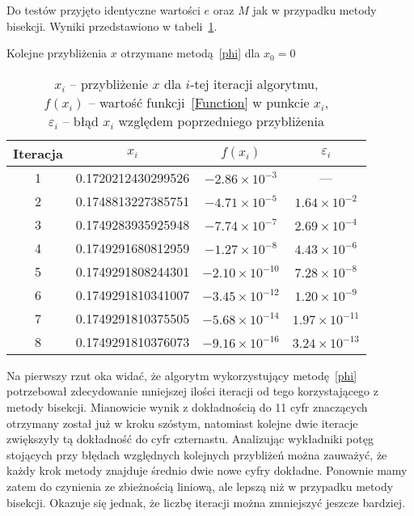 \documentclass[11pt,wide,leqno]{article}
\begin{document}
        Do testów przyjęto identyczne wartości \(e\) oraz \(M\) jak w przypadku metody bisekcji.
        Wyniki przedstawiono w tabeli~\ref{table:two}.
        \begin{table}[h]
            \centering
            \caption{Kolejne przybliżenia \(x\) otrzymane metodą~\eqref{phi}
                    dla \(x_0 = 0\)}\label{table:two}
            \renewcommand{\arraystretch}{1.5}
            \begin{tabular}{|c|c|c|c|} \hline
                Iteracja & \(x_i\) & \(f(x_i)\) & \(\varepsilon_i\) \\ \hline
                1 & 0.1720212430299526 & \(-2.86 \times 10^{-3}\) & --- \\ \hline
                2 & 0.1748813227385751 & \(-4.71 \times 10^{-5}\) & \(1.64 \times 10^{-2}\) \\ \hline
                3 & 0.1749283935925948 & \(-7.74 \times 10^{-7}\) & \(2.69 \times 10^{-4}\) \\ \hline
                4 & 0.1749291680812959 & \(-1.27 \times 10^{-8}\) & \(4.43 \times 10^{-6}\) \\ \hline
                5 & 0.1749291808244301 & \(-2.10 \times 10^{-10}\) & \(7.28 \times 10^{-8}\) \\ \hline
                6 & 0.1749291810341007 & \(-3.45 \times 10^{-12}\) & \(1.20 \times 10^{-9}\) \\ \hline
                7 & 0.1749291810375505 & \(-5.68 \times 10^{-14}\) & \(1.97 \times 10^{-11}\) \\ \hline
                8 & 0.1749291810376073 & \(-9.16 \times 10^{-16}\) & \(3.24 \times 10^{-13}\) \\ \hline
            \end{tabular}
            \caption*{
            \(x_i\) -- przybliżenie \(x\) dla \(i\)-tej iteracji algorytmu, \\
            \(f(x_i)\) -- wartość funkcji~\eqref{Function} w punkcie \(x_i\), \\
            \(\varepsilon_i\) -- błąd \(x_i\) względem poprzedniego przybliżenia}
        \end{table}
        Na pierwszy rzut oka widać, że algorytm wykorzystujący metodę~\eqref{phi} potrzebował zdecydowanie mniejszej
        ilości iteracji od tego korzystającego z metody bisekcji. Mianowicie wynik z dokładnością do 
        11 cyfr znaczących otrzymany został już w kroku szóstym, natomiast kolejne dwie iteracje
        zwiększyły tą dokładność do cyfr czternastu. Analizując wykładniki potęg stojących przy błędach względnych
        kolejnych przybliżeń można zauważyć, że każdy krok metody znajduje średnio dwie nowe cyfry dokładne.
        Ponownie mamy zatem do czynienia ze zbieżnością liniową, ale lepszą niż w przypadku metody bisekcji. 
        Okazuje się jednak, że liczbę iteracji można zmniejszyć jeszcze bardziej.
        
\end{document}
